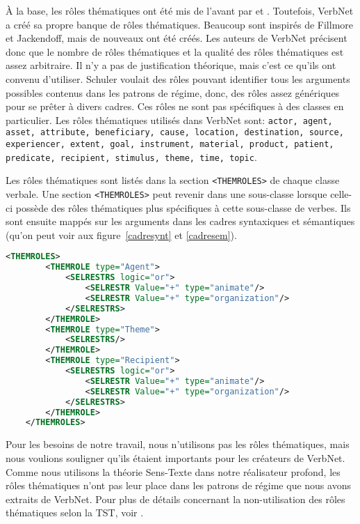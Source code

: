 À la base, les rôles thématiques ont été mis de l'avant par  et \cite{Jackendoff1972-JACSII-2}. Toutefois, VerbNet a créé sa propre banque de rôles thématiques. Beaucoup sont inspirés de Fillmore et Jackendoff, mais de nouveaux ont été créés. Les auteurs de VerbNet précisent donc que le nombre de rôles thématiques et la qualité des rôles thématiques est assez arbitraire. Il n'y a pas de justification théorique, mais c'est ce qu'ils ont convenu d'utiliser. Schuler voulait des rôles pouvant identifier tous les arguments possibles contenus dans les patrons de régime, donc, des rôles assez génériques pour se prêter à divers cadres. Ces rôles ne sont pas spécifiques à des classes en particulier.
Les rôles thématiques utilisés dans VerbNet sont: \texttt{actor, agent, asset, attribute, beneficiary, cause, location, destination, source, experiencer, extent, goal, instrument, material, product, patient, predicate, recipient, stimulus, theme, time, topic}.

Les rôles thématiques sont listés dans la section \lstinline|<THEMROLES>| de chaque classe verbale. Une section \lstinline|<THEMROLES>| peut revenir dans une sous-classe lorsque celle-ci possède des rôles thématiques plus spécifiques à cette sous-classe de verbes. Ils sont ensuite mappés sur les arguments dans les cadres syntaxiques et sémantiques (qu'on peut voir aux figure~\ref{cadresynt} et \ref{cadresem}).

\begin{lstlisting}[language=XML, caption = Les rôles thématiques] % Majuscule aux captions
    <THEMROLES>
        <THEMROLE type="Agent">
            <SELRESTRS logic="or">
                <SELRESTR Value="+" type="animate"/>
                <SELRESTR Value="+" type="organization"/>
            </SELRESTRS>
        </THEMROLE>
        <THEMROLE type="Theme">
            <SELRESTRS/>
        </THEMROLE>
        <THEMROLE type="Recipient">
            <SELRESTRS logic="or">
                <SELRESTR Value="+" type="animate"/>
                <SELRESTR Value="+" type="organization"/>
            </SELRESTRS>
        </THEMROLE>
    </THEMROLES>
\end{lstlisting}

Pour les besoins de notre travail, nous n'utilisons pas les rôles thématiques, mais nous voulions souligner qu'ils étaient importants pour les créateurs de VerbNet. Comme nous utilisons la théorie Sens-Texte dans notre réalisateur profond, les rôles thématiques n'ont pas leur place dans les patrons de régime que nous avons extraits de VerbNet. Pour plus de détails concernant la non-utilisation des rôles thématiques selon la TST, voir \cite[pp.~227--234]{mel2012semantics}.


